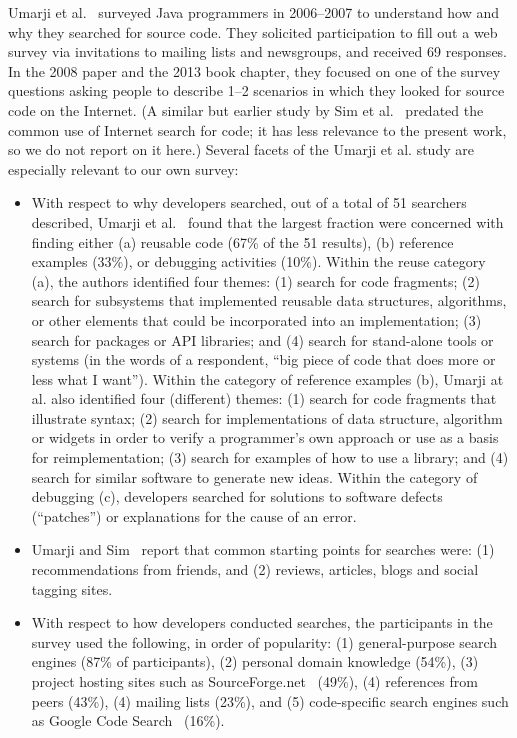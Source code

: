 \documentclass{casicswhitepaper}
\begin{document}
Umarji et al.~\cite{umarji_2008, umarji_2013} surveyed Java programmers in 2006--2007 to understand how and why they searched for source code.  They solicited participation to fill out a web survey via invitations to mailing lists and newsgroups, and received 69 responses.  In the 2008 paper and the 2013 book chapter, they focused on one of the survey questions asking people to describe 1--2 scenarios in which they looked for source code on the Internet.  (A similar but earlier study by Sim et al.~\cite{sim_1998} predated the common use of Internet search for code; it has less relevance to the present work, so we do not report on it here.)  Several facets of the Umarji et al. study are especially relevant to our own survey:

\begin{itemize}

\item With respect to why developers searched, out of a total of 51 searchers described, Umarji et al.~\cite{umarji_2008} found that the largest fraction were concerned with finding either (a) reusable code (67\% of the 51 results), (b) reference examples (33\%), or debugging activities (10\%).  Within the reuse category (a), the authors identified four themes: (1) search for code fragments; (2) search for subsystems that implemented reusable data structures, algorithms, or other elements that could be incorporated into an implementation; (3) search for packages or API libraries; and (4) search for stand-alone tools or systems (in the words of a respondent, ``big piece of code that does more or less what I want'').  Within the category of reference examples (b), Umarji at al. also identified four (different) themes: (1) search for code fragments that illustrate syntax; (2) search for implementations of data structure, algorithm or widgets in order to verify a programmer's own approach or use as a basis for reimplementation; (3) search for examples of how to use a library; and (4) search for similar software to generate new ideas.  Within the category of debugging (c), developers searched for solutions to software defects (``patches'') or explanations for the cause of an error.

\item Umarji and Sim~\cite{umarji_2013} report that common starting points for searches were: (1) recommendations from friends, and (2) reviews, articles, blogs and social tagging sites.

\item With respect to how developers conducted searches, the participants in the survey used the following, in order of popularity: (1) general-purpose search engines (87\% of participants), (2) personal domain knowledge (54\%), (3) project hosting sites such as SourceForge.net~\cite{sourceforge_1999} (49\%), (4) references from peers (43\%), (4) mailing lists (23\%), and (5) code-specific search engines such as Google Code Search~\cite{googlecodesearch_2006} (16\%).


\end{itemize}
\end{document}
